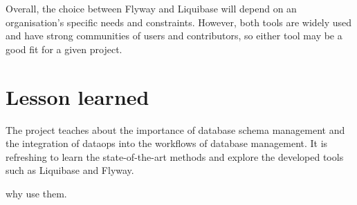 Overall, the choice between Flyway and Liquibase will depend on an organisation's specific needs and constraints. However, both tools are widely used and have strong communities of users and contributors, so either tool may be a good fit for a given project.

\section{Lesson learned}
The project teaches about the importance of database schema management and the integration of dataops into the workflows of database management. It is refreshing to learn the state-of-the-art methods and explore the developed tools such as Liquibase and Flyway.


why use them.









